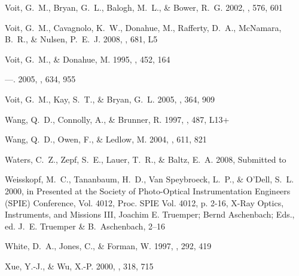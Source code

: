 \documentclass[12pt,preprint]{aastex}
\begin{document}
\begin{thebibliography}{138}
{Voit}, G.~M., {Bryan}, G.~L., {Balogh}, M.~L., \& {Bower}, R.~G. 2002, \apj,
  576, 601

{Voit}, G.~M., {Cavagnolo}, K.~W., {Donahue}, M., {Rafferty}, D.~A.,
  {McNamara}, B.~R., \& {Nulsen}, P.~E.~J. 2008, \apjl, 681, L5

{Voit}, G.~M., \& {Donahue}, M. 1995, \apj, 452, 164

---. 2005, \apj, 634, 955

{Voit}, G.~M., {Kay}, S.~T., \& {Bryan}, G.~L. 2005, \mnras, 364, 909

{Wang}, Q.~D., {Connolly}, A., \& {Brunner}, R. 1997, \apjl, 487, L13+

{Wang}, Q.~D., {Owen}, F., \& {Ledlow}, M. 2004, \apj, 611, 821

{Waters}, C.~Z., {Zepf}, S.~E., {Lauer}, T.~R., \& {Baltz}, E.~A. 2008,
  Submitted to \apj

{Weisskopf}, M.~C., {Tananbaum}, H.~D., {Van Speybroeck}, L.~P., \& {O'Dell},
  S.~L. 2000, in Presented at the Society of Photo-Optical Instrumentation
  Engineers (SPIE) Conference, Vol. 4012, Proc. SPIE Vol. 4012, p. 2-16, X-Ray
  Optics, Instruments, and Missions III, Joachim E. Truemper; Bernd Aschenbach;
  Eds., ed. J.~E. {Truemper} \& B.~{Aschenbach}, 2--16

{White}, D.~A., {Jones}, C., \& {Forman}, W. 1997, \mnras, 292, 419

{Xue}, Y.-J., \& {Wu}, X.-P. 2000, \mnras, 318, 715

\end{thebibliography}








\end{document}
